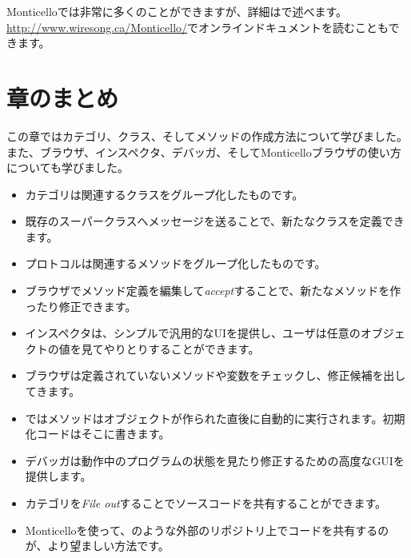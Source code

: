 \documentclass[a4paper,10pt,twoside]{book}
\begin{document}
Monticelloでは非常に多くのことができますが、詳細はで述べます。
\url{http://www.wiresong.ca/Monticello/}でオンラインドキュメントを読むこともできます。

\section{章のまとめ}
この章ではカテゴリ、クラス、そしてメソッドの作成方法について学びました。
また、ブラウザ、インスペクタ、デバッガ、そしてMonticelloブラウザの使い方についても学びました。

\begin{itemize}
  \item カテゴリは関連するクラスをグループ化したものです。
  \item 既存のスーパークラスへメッセージを送ることで、新たなクラスを定義できます。
  \item プロトコルは関連するメソッドをグループ化したものです。
  \item ブラウザでメソッド定義を編集して\emph{accept}することで、新たなメソッドを作ったり修正できます。
  \item インスペクタは、シンプルで汎用的なUIを提供し、ユーザは任意のオブジェクトの値を見てやりとりすることができます。
  \item ブラウザは定義されていないメソッドや変数をチェックし、修正候補を出してきます。
  \item \pharo ではメソッドはオブジェクトが作られた直後に自動的に実行されます。初期化コードはそこに書きます。
  \item デバッガは動作中のプログラムの状態を見たり修正するための高度なGUIを提供します。
  \item カテゴリを\emph{File out}することでソースコードを共有することができます。
  \item Monticelloを使って、\sqsrc のような外部のリポジトリ上でコードを共有するのが、より望ましい方法です。
\end{itemize}

\ifx\wholebook\relax\else
\end{document}
